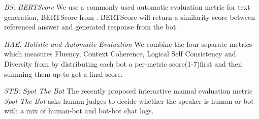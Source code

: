 \noindent
\textit{BS: BERTScore}
We use a commonly used automatic evaluation metric for text generation, 
BERTScore from \citet{zhang2019bertscore}.
BERTScore
will return a similarity score between referenced answer and generated response
from the bot.

\noindent
\textit{HAE: Holistic and Automatic Evaluation} 
We combine the four separate metrics which measures Fluency, Context Coherence, 
Logical Self Consistency and Diversity from \citet{pang-etal-2020-towards} by distributing each bot a per-metric score(1-7)first and then summing them up to get a final score. 

\noindent
\textit{STB: Spot The Bot} 
The recently proposed interactive manual evaluation metric \textit{Spot The Bot} \citep{deriu-etal-2020-spot} asks human judges to decide whether the speaker is human or bot with a mix of human-bot and bot-bot chat logs.   



